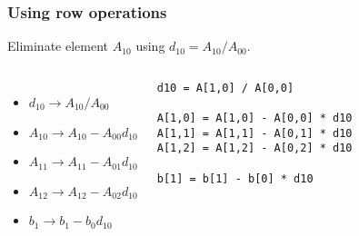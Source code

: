 \begin{frame}[fragile]
  \frametitle{Using row operations}
  Eliminate element $A_{10}$ using $d_{10}=A_{10}/A_{00}$.
  \vfill
  \vfill\pause
  \begin{columns}
  \begin{itemize}
    \item $d_{10}\rightarrow A_{10}/A_{00}$
    \item $A_{10}\rightarrow A_{10}-A_{00}d_{10}$
    \item $A_{11}\rightarrow A_{11}-A_{01}d_{10}$
    \item $A_{12}\rightarrow A_{12}-A_{02}d_{10}$
    \item $b_1   \rightarrow b_1   -b_0   d_{10}$
  \end{itemize}
  \pause
   \begin{lstlisting}
d10 = A[1,0] / A[0,0]

A[1,0] = A[1,0] - A[0,0] * d10
A[1,1] = A[1,1] - A[0,1] * d10
A[1,2] = A[1,2] - A[0,2] * d10

b[1] = b[1] - b[0] * d10
   \end{lstlisting}
  \end{columns}
\end{frame}

